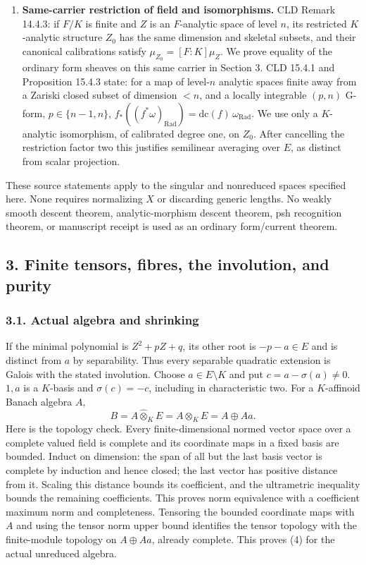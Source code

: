 \documentclass[
  11pt,
]{article}
\begin{document}
\begin{enumerate}
  input.
\item
  \textbf{Same-carrier restriction of field and isomorphisms.} CLD
  Remark 14.4.3: if \(F/K\) is finite and \(Z\) is an \(F\)-analytic
  space of level \(n\), its restricted \(K\)-analytic structure \(Z_0\)
  has the same dimension and skeletal subsets, and their canonical
  calibrations satisfy \(\mu_{Z_0}=[F:K]\mu_Z\). We prove equality of
  the ordinary form sheaves on this same carrier in Section 3. CLD
  15.4.1 and Proposition 15.4.3 state: for a map of level-\(n\) analytic
  spaces finite away from a Zariski closed subset of dimension \(<n\),
  and a locally integrable \((p,n)\) G-form, \(p\in\{n-1,n\}\),
  \(f_*((f^*\omega)_{\mathrm{Rad}})
      =\mathrm{dc}(f)\,\omega_{\mathrm{Rad}}\). We use only a
  \(K\)-analytic isomorphism, of calibrated degree one, on \(Z_0\).
  After cancelling the restriction factor two this justifies semilinear
  averaging over \(E\), as distinct from scalar projection.
\end{enumerate}

These source statements apply to the singular and nonreduced spaces
specified here. None requires normalizing \(X\) or discarding generic
lengths. No weakly smooth descent theorem, analytic-morphism descent
theorem, psh recognition theorem, or manuscript receipt is used as an
ordinary form/current theorem.

\subsection{3. Finite tensors, fibres, the involution, and
purity}\label{finite-tensors-fibres-the-involution-and-purity}

\subsubsection{3.1. Actual algebra and
shrinking}\label{actual-algebra-and-shrinking}

If the minimal polynomial is \(Z^2+pZ+q\), its other root is
\(-p-a\in E\) and is distinct from \(a\) by separability. Thus every
separable quadratic extension is Galois with the stated involution.
Choose \(a\in E\setminus K\) and put \(c=a-\sigma(a)\ne0\). \(1,a\) is a
\(K\)-basis and \(\sigma(c)=-c\), including in characteristic two. For a
\(K\)-affinoid Banach algebra \(A\), \[
 B=A\widehat\otimes_K E=A\otimes_K E=A\oplus Aa.             \tag{4}
\] Here is the topology check. Every finite-dimensional normed vector
space over a complete valued field is complete and its coordinate maps
in a fixed basis are bounded. Induct on dimension: the span of all but
the last basis vector is complete by induction and hence closed; the
last vector has positive distance from it. Scaling this distance bounds
its coefficient, and the ultrametric inequality bounds the remaining
coefficients. This proves norm equivalence with a coefficient maximum
norm and completeness. Tensoring the bounded coordinate maps with \(A\)
and using the tensor norm upper bound identifies the tensor topology
with the finite-module topology on \(A\oplus Aa\), already complete.
This proves (4) for the actual unreduced algebra.
\end{document}

